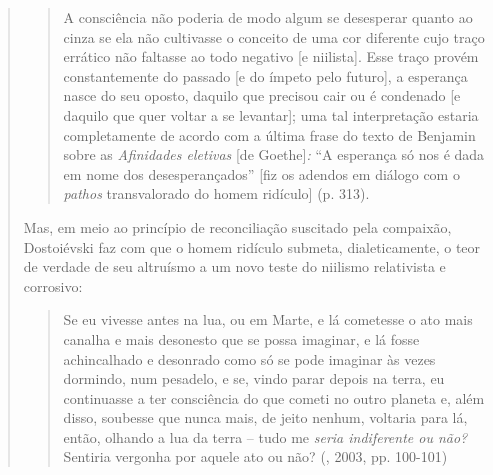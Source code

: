 {\begin{quote}
\begin{quote}
A consciência não poderia de modo algum se desesperar quanto ao cinza se
ela não cultivasse o conceito de uma cor diferente cujo traço errático
não faltasse ao todo negativo {[}e niilista{]}. Esse traço provém
constantemente do passado {[}e do ímpeto pelo futuro{]}, a esperança
nasce do seu oposto, daquilo que precisou cair ou é condenado {[}e
daquilo que quer voltar a se levantar{]}; uma tal interpretação estaria
completamente de acordo com a última frase do texto de Benjamin sobre as
\emph{Afinidades eletivas} {[}de Goethe{]}\emph{:} ``A esperança só nos
é dada em nome dos desesperançados'' {[}fiz os adendos em diálogo com o
\emph{pathos} transvalorado do homem ridículo{]} (p. 313).
\end{quote}

Mas, em meio ao princípio de reconciliação suscitado pela compaixão,
Dostoiévski faz com que o homem ridículo submeta, dialeticamente, o teor
de verdade de seu altruísmo a um novo teste do niilismo relativista e
corrosivo:

\begin{quote}
Se eu vivesse antes na lua, ou em Marte, e lá cometesse o ato mais
canalha e mais desonesto que se possa imaginar, e lá fosse achincalhado
e desonrado como só se pode imaginar às vezes dormindo, num pesadelo, e
se, vindo parar depois na terra, eu continuasse a ter consciência do que
cometi no outro planeta e, além disso, soubesse que nunca mais, de jeito
nenhum, voltaria para lá, então, olhando a lua da terra -- tudo me
\emph{seria indiferente ou não?} Sentiria vergonha por aquele ato ou
não? (, 2003, pp. 100-101)
\end{quote}


\end{quote}}
